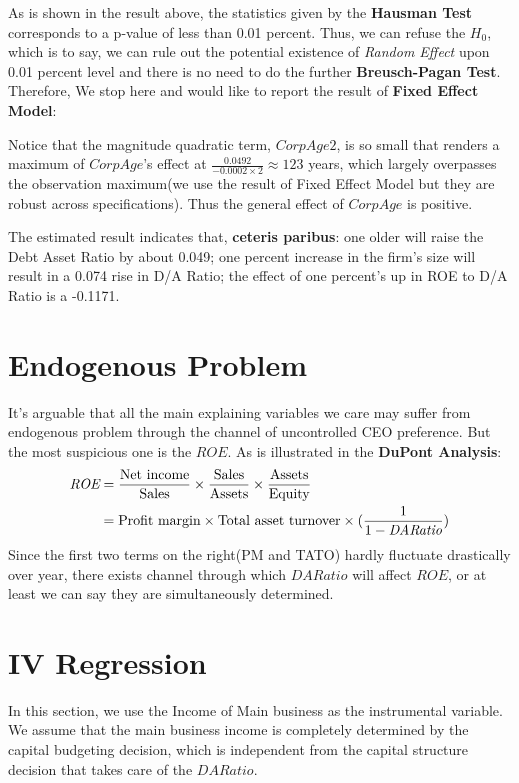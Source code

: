 \documentclass{article}
\begin{document}
	\begin{stlog}
	\nullskip
	\end{stlog}

As is shown in the result above, the statistics given by the {\bf Hausman Test} corresponds to a p-value of less than 0.01 percent. Thus, we can refuse the $H_0$, which is to say, we can rule out the potential existence of {\it Random Effect} upon 0.01 percent level and there is no need to do the further {\bf Breusch-Pagan Test}. 
Therefore, We stop here and would like to report the result of {\bf Fixed Effect Model}:

Notice that the magnitude quadratic term, $CorpAge2$, is so small that renders a maximum of $CorpAge$'s effect at $\frac{0.0492}{-0.0002\times2}\approx 123$ years, which largely overpasses the observation maximum(we use the result of Fixed Effect Model but they are robust across specifications). Thus the general effect of $CorpAge$ is positive.

The estimated result indicates that, {\bf ceteris paribus}: one older will raise the Debt Asset Ratio by about 0.049; one percent increase in the firm's size will result in a 0.074 rise in D/A Ratio; the effect of one percent's up in ROE to D/A Ratio is a -0.1171.

\newpage
\section{Endogenous Problem}\label{sec:endogenous}
It's arguable that all the main explaining variables we care may suffer from endogenous problem through the channel of uncontrolled CEO preference. But the most suspicious one is the $ROE$. As is illustrated in the {\bf DuPont Analysis}:
\begin{align}
	\notag
	\textit{ROE} &= \frac{\text{Net income}}{\text{Sales}}\times\frac{\text{Sales}}{\text{Assets}}\times\frac{\text{Assets}}{\text{Equity}}\\
	&= \text{Profit margin}\times\text{Total asset turnover}\times(\frac{1}{1-\textit{DARatio}})
\end{align}
Since the first two terms on the right(PM and TATO) hardly fluctuate drastically over year, there exists channel through which $DARatio$ will affect $ROE$, or at least we can say they are simultaneously determined.

\section{IV Regression}\label{sec:IV}
In this section, we use the Income of Main business as the instrumental variable. We assume that the main business income is completely determined by the capital budgeting decision, which is independent from the capital structure decision that takes care of the $DARatio$. 

\end{document}
